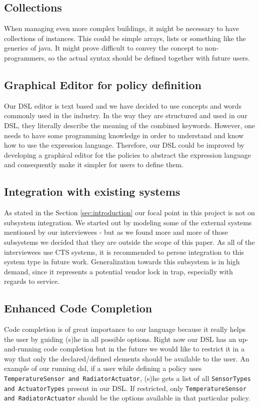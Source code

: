 \subsection{Collections}\label{subsec:collections}
When managing even more complex buildings, it might be necessary to have collections of instances. This could be simple arrays, lists or something like the generics of java. It might prove difficult to convey the concept to non-programmers, so the actual syntax should be defined together with future users.

\subsection{Graphical Editor for policy definition}\label{subsec:graphicaleditor}
Our DSL editor is text based and we have decided to use concepts and words commonly used in the industry. In the way they are structured and used in our DSL, they literally describe the meaning of the combined keywords. However, one needs to have some programming knowledge in order to understand and know how to use the expression language. Therefore, our DSL could be improved by developing a graphical editor for the policies to abstract the expression language and consequently make it simpler for users to define them.

\subsection{Integration with existing systems}\label{subsec:integration}
As stated in the Section \ref{sec:introduction} our focal point in this project is not on subsystem integration. We started out by modeling some of the external systems mentioned by our interviewees - but as we found more and more of those subsystems we decided that they are outside the scope of this paper. As all of the interviewees use CTS systems, it is recommended to persue integration to this system type in future work. Generalization towards this subsystem is in high demand, since it represents a potential vendor lock in trap, especially with regards to service.

\subsection{Enhanced Code Completion}\label{subsec:codecompletion}
Code completion is of great importance to our language because it really helps the user by guiding (s)he in all possible options. Right now our DSL has an up-and-running code completion but in the future we would like to restrict it in a way that only the declared/defined elements should be available to the user. An example of our running dsl, if a user while defining a policy uses \texttt{TemperatureSensor and RadiatorActuator}, (s)he gets a list of all \texttt{SensorTypes and ActuatorTypes} present in our DSL. If restricted, only \texttt{TemperatureSensor and RadiatorActuator} should be the options available in that particular policy.

